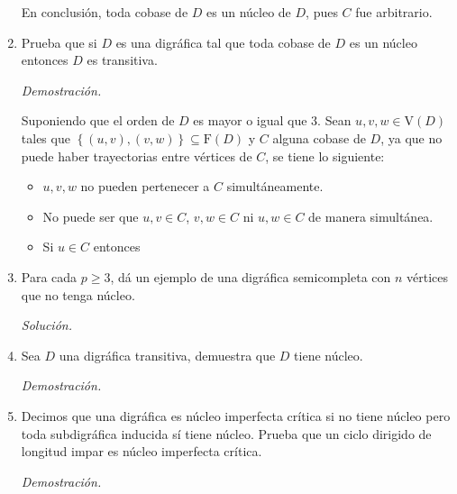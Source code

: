 \documentclass[12pt, fleqn]{article}
\newcommand{\V}[1]{\mathrm{V} \! \left( #1 \right)}
\newcommand{\F}[1]{\mathrm{F} \! \left( #1 \right)}
\begin{document}
\begin{enumerate}
		En conclusión, toda cobase de $D$ es un núcleo de $D$, pues $C$ fue arbitrario.

		\item Prueba que si $D$ es una digráfica tal que toda cobase de $D$ es un núcleo entonces $D$ es transitiva.
		
		\emph{Demostración.}

		Suponiendo que el orden de $D$ es mayor o igual que 3. Sean $ u, v, w \in \V{D} $ tales que $ \left\lbrace (u, v), (v, w) \right\rbrace \subseteq \F{D} $ y $C$ alguna cobase de $D$, ya que no puede haber trayectorias entre vértices de $C$, se tiene lo siguiente:

		\begin{itemize}
			\item $ u, v, w $ no pueden pertenecer a $C$ simultáneamente.
			\item No puede ser que $ u, v \in C $, $ v, w \in C $ ni $ u, w \in C $ de manera simultánea.
			\item Si $ u \in C $ entonces 
		\end{itemize}
		
		\item Para cada $ p \geq 3 $, dá un ejemplo de una digráfica semicompleta con $n$ vértices que no tenga núcleo.
		
		\emph{Solución.}

		
		
		\item Sea $D$ una digráfica transitiva, demuestra que $D$ tiene núcleo.
		
		\emph{Demostración.}

		
		
		\item Decimos que una digráfica es núcleo imperfecta crítica si no tiene núcleo pero toda subdigráfica inducida sí tiene núcleo. Prueba que un ciclo dirigido de longitud impar es núcleo imperfecta crítica.
		
		\emph{Demostración.}

		
		
	\end{enumerate}
\end{document}
